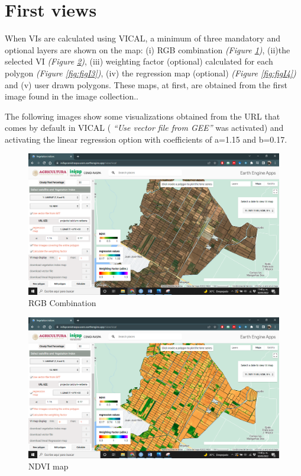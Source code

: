 \documentclass[
]{book}
\begin{document}
\hypertarget{PriVis}{%
\section{First views}\label{PriVis}}

When VIs are calculated using VICAL, a minimum of three mandatory and optional layers are shown on the map: (i) RGB combination \emph{(Figure \ref{fig:figI1})}, (ii)the selected VI \emph{(Figure \ref{fig:figI2})}, (iii) weighting factor (optional) calculated for each polygon \emph{(Figure \ref{fig:figI3})}, (iv) the regression map (optional) \emph{(Figure \ref{fig:figI4})} and (v) user drawn polygons. These maps, at first, are obtained from the first image found in the image collection..

The following images show some visualizations obtained from the URL that comes by default in VICAL ( \emph{``Use vector file from GEE''} was activated) and activating the linear regression option with coefficients of a=1.15 and b=0.17.

\begin{figure}

{\centering \includegraphics[width=0.85\linewidth]{./images/Figure51} 

}

\caption{RGB Combination}\label{fig:figI1}
\end{figure}

\begin{figure}

{\centering \includegraphics[width=0.85\linewidth]{./images/Figure52} 

}

\caption{NDVI map}\label{fig:figI2}
\end{figure}
\end{document}
